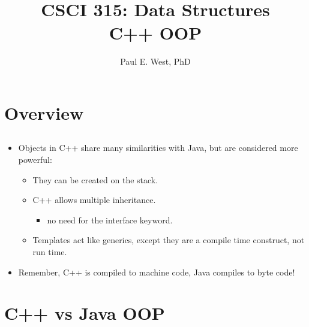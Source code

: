 \documentclass{beamer}
\title{CSCI 315: Data Structures \\ C++ OOP}
\author{Paul E. West, PhD}
\institute{
  Department of Computer Science\\
  Charleston Southern University
}
\begin{document}
\begin{frame}
  \titlepage
\end{frame}

\section{Overview}
\subsection{}

\begin{frame}{}
\begin{itemize}
\item Objects in C++ share many similarities with Java, but are considered more powerful:
\begin{itemize}
\item They can be created on the stack.
\item C++ allows multiple inheritance.
\begin{itemize}
\item no need for the interface keyword.
\end{itemize}
\item Templates act like generics, except they are a compile time construct, not run time.
\end{itemize}
\item Remember, C++ is compiled to machine code, Java compiles to byte code!
\end{itemize}
\end{frame}

\section{C++ vs Java OOP}
\subsection{}
\end{document}
